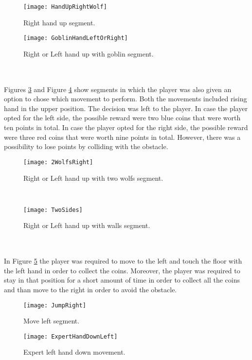 \begin{figure}[h]
    \centering
    \texttt{[image: HandUpRightWolf]}
    \caption{Right hand up segment.}
    \label{fig:wolfRight}
\end{figure}
\begin{figure}[h]
    \centering
    \texttt{[image: GoblinHandLeftOrRight]}
    \caption{Right or Left hand up with goblin segment.}
    \label{fig:goblin}
\end{figure}\\\\
Figures \ref{fig:2wolfs} and Figure \ref{fig:2sides} show segments in which the player was also given an option to chose which movement to perform. Both the movements included rising hand in the upper position. The decision was left to the player. In case the player opted for the left side, the possible reward were two blue coins that were worth ten points in total. In case the player opted for the right side, the possible reward were three red coins that were worth nine points in total. However, there was a possibility to lose points by colliding with the obstacle.\\
\begin{figure}[h]
    \centering
    \texttt{[image: 2WolfsRight]}
    \caption{Right or Left hand up with two wolfs segment.}
    \label{fig:2wolfs}
\end{figure}\\
\begin{figure}[h]
    \centering
    \texttt{[image: TwoSides]}
    \caption{Right or Left hand up with walls segment.}
    \label{fig:2sides}
\end{figure}\\\\
In Figure \ref{fig:jumpleft} the player was required to move to the left and touch the floor with the left hand in order to collect the coins. Moreover, the player was required to stay in that position for a short amount of time in order to collect all the coins and than move to the right in order to avoid the obstacle.
\begin{figure}[h]
    \centering
    \texttt{[image: JumpRight]}
    \caption{Move left segment.}
    \label{fig:jumpleft}
\end{figure}
\begin{figure}[h]
    \centering
    \texttt{[image: ExpertHandDownLeft]}
    \caption{Expert left hand down movement.}
    \label{fig:expertLeftDown}
\end{figure}\\
